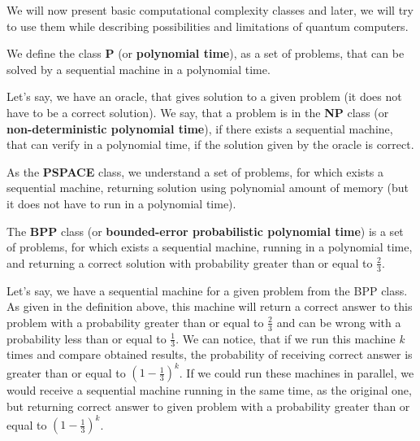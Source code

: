 We will now present basic computational complexity classes and later, we will try to use them while describing possibilities and limitations of quantum computers.

\begin{definition}
We define the class \textbf{P} (or \textbf{polynomial time}), as a set of problems, that can be solved by a sequential machine in a polynomial time.
\end{definition}

\begin{definition}
Let's say, we have an oracle, that gives solution to a given problem (it does not have to be a correct solution). We say, that a problem is in the \textbf{NP} class (or \textbf{non-deterministic polynomial time}), if there exists a sequential machine, that can verify in a polynomial time, if the solution given by the oracle is correct.
\end{definition}

\begin{definition}
As the \textbf{PSPACE} class, we understand a set of problems, for which exists a sequential machine, returning solution using polynomial amount of memory (but it does not have to run in a polynomial time).
\end{definition}

\begin{definition}\label{BPP}
The \textbf{BPP} class (or \textbf{bounded-error probabilistic polynomial time}) is a set of problems, for which exists a sequential machine, running in a polynomial time, and returning a correct solution with probability greater than or equal to $\frac{2}{3}$.
\end{definition}

\begin{remark}
Let's say, we have a sequential machine for a given problem from the BPP class. As given in the definition above, this machine will return a correct answer to this problem with a probability greater than or equal to $\frac{2}{3}$ and can be wrong with a probability less than or equal to $\frac{1}{3}$. We can notice, that if we run this machine \textit{k} times and compare obtained results, the probability of receiving correct answer is greater than or equal to $(1 - \frac{1}{3})^k$. If we could run these machines in parallel, we would receive a sequential machine running in the same time, as the original one, but returning correct answer to given problem with a probability greater than or equal to $(1 - \frac{1}{3})^k$.
\end{remark}

